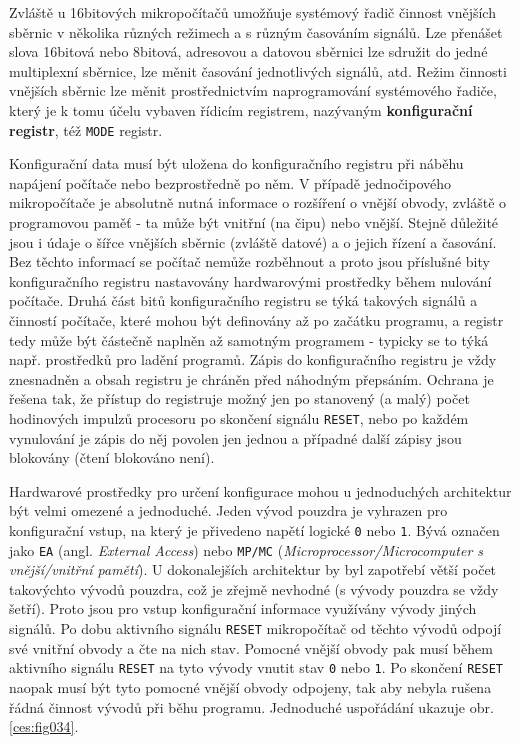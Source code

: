       Zvláště u 16bitových mikropočítačů umožňuje systémový řadič činnost vnějších sběrnic v 
      několika různých režimech a s různým časováním signálů. Lze přenášet slova 16bitová nebo 
      8bitová, adresovou a datovou sběrnici lze sdružit do jedné multiplexní sběrnice, lze měnit 
      časování jednotlivých signálů, atd. Režim činnosti vnějších sběrnic lze měnit prostřednictvím 
      naprogramování systémového řadiče, který je k tomu účelu vybaven řídicím registrem, nazývaným 
      \textbf{konfigurační registr}, též \texttt{MODE} registr.
      
    
      Konfigurační data musí být uložena do konfiguračního registru při náběhu napájení počítače 
      nebo bezprostředně po něm. V případě jednočipového mikropočítače je absolutně nutná informace 
      o rozšíření o vnější obvody, zvláště o programovou paměť - ta může být vnitřní (na čipu) nebo 
      vnější. Stejně důležité jsou i údaje o šířce vnějších sběrnic (zvláště datové) a o jejich 
      řízení a časování. Bez těchto informací se počítač nemůže rozběhnout a proto jsou příslušné 
      bity konfiguračního registru nastavovány hardwarovými prostředky během nulování počítače. 
      Druhá část bitů konfiguračního registru se týká takových signálů a činností počítače, které 
      mohou být definovány až po začátku programu, a registr tedy může být částečně naplněn až 
      samotným programem - typicky se to týká např. prostředků pro ladění programů. Zápis do 
      konfiguračního registru je vždy znesnadněn a obsah registru je chráněn před náhodným 
      přepsáním. Ochrana je řešena tak, že přístup do registruje možný jen po stanovený (a malý) 
      počet hodinových impulzů procesoru po skončení signálu \texttt{RESET}, nebo po každém 
      vynulování je zápis do něj povolen jen jednou a případné další zápisy jsou blokovány (čtení 
      blokováno není).
      
      Hardwarové prostředky pro určení konfigurace mohou u jednoduchých architektur být velmi 
      omezené a jednoduché. Jeden vývod pouzdra je vyhrazen pro konfigurační vstup, na který je 
      přivedeno napětí logické \texttt{0} nebo \texttt{1}. Bývá označen jako \texttt{EA} (angl. 
      \emph{External Access}) nebo \texttt{MP/MC} (\emph{Microprocessor/Microcomputer s 
      vnější/vnitřní pamětí}). U dokonalejších architektur by byl zapotřebí větší počet takovýchto 
      vývodů pouzdra, což je zřejmě nevhodné (s vývody pouzdra se vždy šetří). Proto jsou pro vstup 
      konfigurační informace využívány vývody jiných signálů. Po dobu aktivního signálu 
      \texttt{RESET} mikropočítač od těchto vývodů odpojí své vnitřní obvody a čte na 
      nich stav. Pomocné vnější obvody pak musí během aktivního signálu \texttt{RESET} na tyto 
      vývody vnutit stav \texttt{0} nebo \texttt{1}. Po skončení \texttt{RESET} naopak musí být 
      tyto pomocné vnější obvody odpojeny, tak aby nebyla rušena řádná činnost vývodů při běhu 
      programu. Jednoduché uspořádání ukazuje obr. \ref{ces:fig034}.
      
